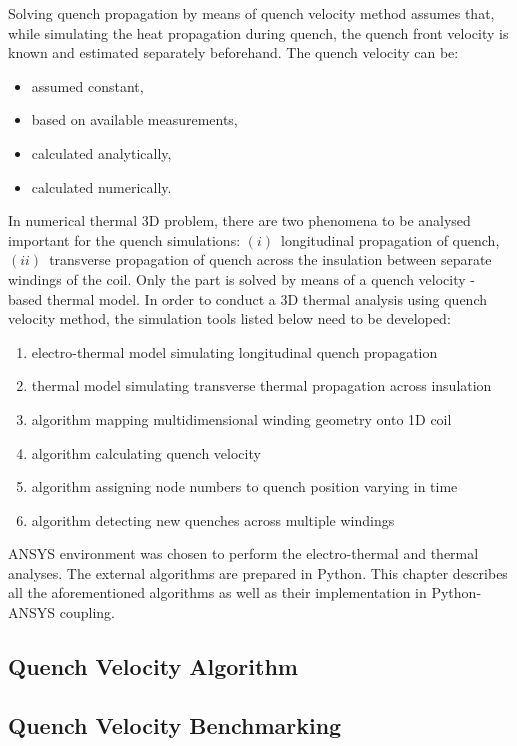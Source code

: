 \documentclass{article}
\begin{document}
Solving quench propagation by means of quench velocity method assumes that, while  simulating the heat propagation during quench, the quench front velocity is known and estimated separately beforehand. The quench velocity can be:
\begin{itemize}
\item assumed constant,
\item based on available measurements,
\item calculated analytically,
\item calculated numerically.
\end{itemize}

In numerical thermal 3D problem, there are two phenomena to be analysed important for the quench simulations: $(i)$~longitudinal propagation of quench, $(ii)$~transverse propagation of quench across the insulation between separate windings of the coil. Only the  part is solved by means of a quench velocity - based thermal model. In order to conduct a 3D thermal analysis using quench velocity method, the simulation tools listed below need to be developed: 
\begin{enumerate}
\item electro-thermal model simulating longitudinal quench propagation
\item thermal model simulating transverse thermal propagation across insulation
\item algorithm mapping multidimensional winding geometry onto 1D coil
\item algorithm calculating quench velocity
\item algorithm assigning node numbers to quench position varying in time
\item algorithm detecting new quenches across multiple windings
\end{enumerate}

ANSYS environment was chosen to perform the electro-thermal and thermal analyses. The external algorithms are prepared in Python. This chapter describes all the aforementioned algorithms as well as their implementation in Python-ANSYS coupling.

\subsection{Quench Velocity Algorithm}
\label{subsection:quench_velocity_algorithm}


\subsection{Quench Velocity Benchmarking}
\label{subsection:quench_velocity_benchmarking}

\end{document}
